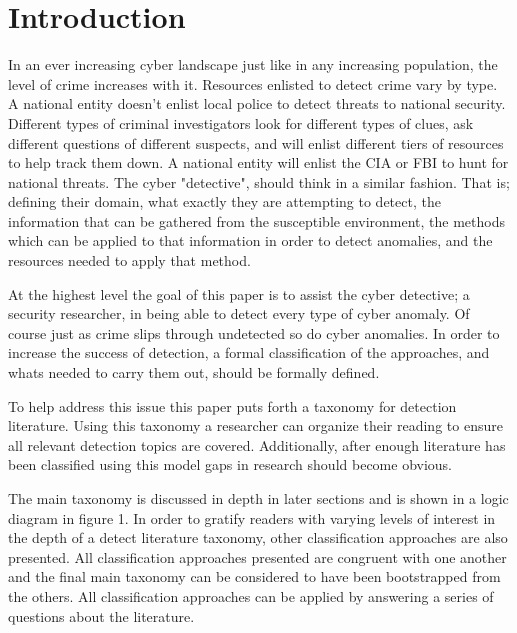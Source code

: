 \section{Introduction}
In an ever increasing cyber landscape just like in any increasing population, the level of crime increases with it. 
Resources enlisted to detect crime vary by type. A national entity doesn't  enlist local police to detect threats to national security.
Different types of criminal investigators look for different types of clues, ask different questions of different suspects, and will enlist different tiers of resources to help track them down. 
A national entity will enlist the CIA or FBI to hunt for national threats.  
The cyber "detective", should think in a similar fashion. 
That is; defining their domain, what exactly they are attempting to detect, the information that can be gathered from the susceptible environment, the methods which can be applied to that information in order to detect anomalies, and the resources needed to apply that method. 

At the highest level the goal of this paper is to assist the cyber detective; a security researcher, in being able to detect every type of cyber anomaly.  
Of course  just as crime slips through undetected so do cyber anomalies. 
In order to increase the success of detection, a formal classification of the approaches, and whats needed to carry them out, should be formally defined. 

To help address this issue this paper puts forth a taxonomy for detection literature. 
Using this taxonomy a researcher can organize their reading to ensure all relevant detection topics are covered. 
Additionally, after enough literature has been classified using this model gaps in research should become obvious. 

The main taxonomy is discussed in depth in later sections and is shown in a logic diagram in figure 1.  
In order to gratify readers with varying levels of interest in the depth of a detect literature taxonomy, other classification approaches are also presented. 
All classification approaches presented are congruent with one another and the final main taxonomy can be considered to have been bootstrapped from the others. 
All classification approaches can be applied by answering a series of questions about the literature. 

